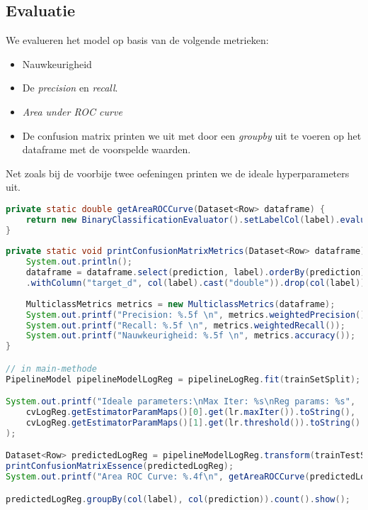 \documentclass[a4paper,10pt,twoside]{report}
\begin{document}
\newpage

\subsection*{Evaluatie}

We evalueren het model op basis van de volgende metrieken:
\begin{itemize}
	\item Nauwkeurigheid
	\item De \textit{precision} en \textit{recall}.
	\item \textit{Area under ROC curve}
	\item De confusion matrix printen we uit met door een \textit{groupby} uit te voeren op het dataframe met de voorspelde waarden.
\end{itemize}

Net zoals bij de voorbije twee oefeningen printen we de ideale hyperparameters uit.

\begin{lstlisting}[language=Java]
private static double getAreaROCCurve(Dataset<Row> dataframe) {
	return new BinaryClassificationEvaluator().setLabelCol(label).evaluate(dataframe);
}
	
private static void printConfusionMatrixMetrics(Dataset<Row> dataframe) {
	System.out.println();
	dataframe = dataframe.select(prediction, label).orderBy(prediction)
	.withColumn("target_d", col(label).cast("double")).drop(col(label));
	
	MulticlassMetrics metrics = new MulticlassMetrics(dataframe);
	System.out.printf("Precision: %.5f \n", metrics.weightedPrecision());
	System.out.printf("Recall: %.5f \n", metrics.weightedRecall());
	System.out.printf("Nauwkeurigheid: %.5f \n", metrics.accuracy());
}

// in main-methode
PipelineModel pipelineModelLogReg = pipelineLogReg.fit(trainSetSplit);

System.out.printf("Ideale parameters:\nMax Iter: %s\nReg params: %s", 	
	cvLogReg.getEstimatorParamMaps()[0].get(lr.maxIter()).toString(),
	cvLogReg.getEstimatorParamMaps()[1].get(lr.threshold()).toString()
);

Dataset<Row> predictedLogReg = pipelineModelLogReg.transform(trainTestSplit);
printConfusionMatrixEssence(predictedLogReg);
System.out.printf("Area ROC Curve: %.4f\n", getAreaROCCurve(predictedLogReg));

predictedLogReg.groupBy(col(label), col(prediction)).count().show();
\end{lstlisting}
\end{document}
